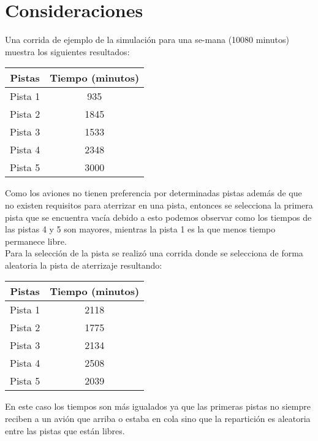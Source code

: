 \documentclass[a4paper,10pt,twocolumn]{article}
\begin{document}
\section{Consideraciones}

	
	Una corrida de ejemplo de la simulaci\'on para una 
	se-mana (10080 minutos) muestra los siguientes resultados:
	\begin{center}
		\begin{tabular}[t]{|c|c|}
			\hline
			Pistas & Tiempo (minutos) \\ \hline
			Pista 1 & 935 \\ \hline
			Pista 2 & 1845 \\ \hline
			Pista 3 & 1533 \\ \hline
			Pista 4 & 2348 \\ \hline
			Pista 5 & 3000 \\ \hline
		\end{tabular}
	\end{center}

	Como los aviones no tienen preferencia por determinadas pistas adem\'as de que
	no existen requisitos para aterrizar en una pista, entonces se selecciona la primera
	pista que se encuentra vac\'ia debido a esto podemos observar como los tiempos de las
	pistas 4 y 5 son mayores, mientras la pista 1 es la que menos tiempo permanece libre.\\

	Para la selecci\'on de la pista se realiz\'o una corrida donde se selecciona de forma
	aleatoria la pista de aterrizaje resultando:
	\begin{center}
		\begin{tabular}[t]{|c|c|}
			\hline
			Pistas & Tiempo (minutos) \\ \hline
			Pista 1 & 2118 \\ \hline
			Pista 2 & 1775 \\ \hline
			Pista 3 & 2134 \\ \hline
			Pista 4 & 2508 \\ \hline
			Pista 5 & 2039 \\ \hline
		\end{tabular}
	\end{center}

	En este caso los tiempos son m\'as igualados ya que las primeras pistas no siempre
	reciben a un avi\'on que arriba o estaba en cola sino que la repartici\'on es aleatoria
	entre las pistas que est\'an libres.
\end{document}
